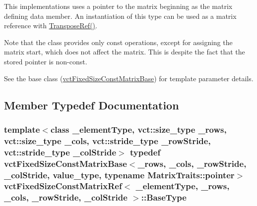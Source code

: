 This implementations uses a pointer to the matrix beginning as the matrix defining data member. An instantiation of this type can be used as a matrix reference with \hyperlink{classvct_fixed_size_const_matrix_base_af8ce7322fff5aa54c0598938041a5096}{Transpose\+Ref()}.

Note that the class provides only const operations, except for assigning the matrix start, which does not affect the matrix. This is despite the fact that the stored pointer is non-\/const.

See the base class (\hyperlink{classvct_fixed_size_const_matrix_base}{vct\+Fixed\+Size\+Const\+Matrix\+Base}) for template parameter details. 

\subsection{Member Typedef Documentation}
\hypertarget{classvct_fixed_size_const_matrix_ref_ac3466e6a4fd2ab31f5f15265e09006d3}{}
\subsubsection[{Base\+Type}]{\setlength{\rightskip}{0pt plus 5cm}template$<$class \+\_\+element\+Type, vct\+::size\+\_\+type \+\_\+rows, vct\+::size\+\_\+type \+\_\+cols, vct\+::stride\+\_\+type \+\_\+row\+Stride, vct\+::stride\+\_\+type \+\_\+col\+Stride$>$ typedef {\bf vct\+Fixed\+Size\+Const\+Matrix\+Base}$<$\+\_\+rows, \+\_\+cols, \+\_\+row\+Stride, \+\_\+col\+Stride, value\+\_\+type, typename Matrix\+Traits\+::pointer$>$ {\bf vct\+Fixed\+Size\+Const\+Matrix\+Ref}$<$ \+\_\+element\+Type, \+\_\+rows, \+\_\+cols, \+\_\+row\+Stride, \+\_\+col\+Stride $>$\+::{\bf Base\+Type}}\label{classvct_fixed_size_const_matrix_ref_ac3466e6a4fd2ab31f5f15265e09006d3}
\hypertarget{classvct_fixed_size_const_matrix_ref_ab035e90a0971ab4bf03d819b5bd31ecc}{}
